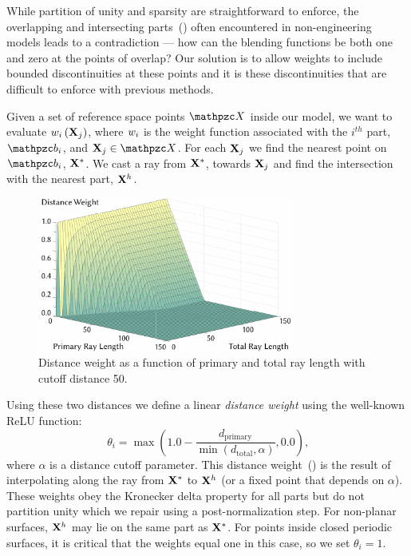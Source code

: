 While partition of unity and sparsity are straightforward to enforce, the overlapping and intersecting parts~() often encountered in non-engineering models leads
to a contradiction --- how can the blending functions be both one and zero at the points of overlap? 
Our solution is to allow weights to include bounded discontinuities at these points and it is these discontinuities that are difficult to enforce 
with previous methods. 

Given a set of reference space points $\st{X}$ inside our model, we want to evaluate $w_i\left(\mathbf{X}_j\right)$, where $w_i$ is the weight function associated with 
the $i^{th}$ part, $\prt_i$, and $\refX_j\in\st{X}$. 
For each $\mathbf{X}_j$ we find the nearest point on $\prt_i$, $\mathbf{X}^*$.
We cast a ray from $\mathbf{X}^*$, towards $\mathbf{X}_j$ and find the intersection with the nearest part, $\mathbf{X}^h$.

\begin{figure}[h]
    \centering
    \includegraphics[width=3.33in]{figures/plot_distance_weight.pdf}
    \caption{Distance weight as a function of primary and total ray length with cutoff distance 50.}
    \label{fig:plot_distance_weight}
    \vspace{-5pt}
\end{figure} 

Using these two distances we define a linear \emph{distance weight} using the well-known ReLU function:
\begin{equation}
\theta_i = \max \left(1.0 - \frac{d_{\text{primary}}}{\min (d_{\text{total}}, \alpha)}, 0.0\right)
\text{,}
\end{equation}
where $\alpha$ is a distance cutoff parameter. 
This distance weight~() is the result of interpolating along the ray from $\mathbf{X}^*$ to $\mathbf{X}^h$ (or a fixed point that depends on $\alpha$). 
These weights obey the Kronecker delta property for all parts but do not partition unity which we repair using a post-normalization step. For non-planar surfaces, $\mathbf{X}^h$ may lie on the same part as $\mathbf{X}^*$. For points inside closed periodic surfaces, it is critical that the weights equal one in this case, so we set $\theta_i = 1$.

